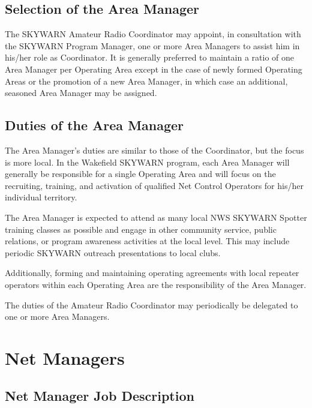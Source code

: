 \documentclass[pdflatex,letterpaper,twoside,12pt]{book}
\begin{document}
\subsection{Selection of the Area Manager}

The SKYWARN Amateur Radio Coordinator may appoint, in consultation with the SKYWARN Program Manager, one or more Area Managers to assist him in his/her role as Coordinator.  It is generally preferred to maintain a ratio of one Area Manager per Operating Area except in the case of newly formed Operating Areas or the promotion of a new Area Manager, in which case an additional, seasoned Area Manager may be assigned. 

\subsection{Duties of the Area Manager}

The Area Manager's duties are similar to those of the Coordinator, but the focus is more local.  In the Wakefield SKYWARN program, each Area Manager will generally be responsible for a single Operating Area and will focus on the recruiting, training, and activation of qualified Net Control Operators for his/her individual territory. 

The Area Manager is expected to attend as many local NWS SKYWARN Spotter training classes as possible and engage in other community service, public relations, or program awareness activities at the local level.  This may include periodic SKYWARN outreach presentations to local clubs.

Additionally, forming and maintaining operating agreements with local repeater operators within each Operating Area are the responsibility of the Area Manager.

The duties of the Amateur Radio Coordinator may periodically be delegated to one or more Area Managers.


\section{Net Managers}\label{net-manager}

\subsection{Net Manager Job Description}\label{nm-jobdesc}
\end{document}
